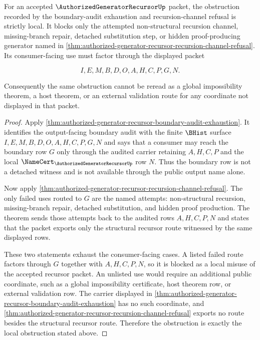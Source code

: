 \begin{corollary}
\label{cor:authorized-generator-recursor-boundary-audit-strict-obstruction}
For an accepted $\AuthorizedGeneratorRecursorUp$ packet, the obstruction recorded by the boundary-audit exhaustion and recursion-channel refusal is strictly local. It blocks only the attempted non-structural recursion channel, missing-branch repair, detached substitution step, or hidden proof-producing generator named in \autoref{thm:authorized-generator-recursor-recursion-channel-refusal}. Its consumer-facing use must factor through the displayed packet

$$
I,E,M,B,D,O,A,H,C,P,G,N.
$$

Consequently the same obstruction cannot be reread as a global impossibility theorem, a host theorem, or an external validation route for any coordinate not displayed in that packet.
\end{corollary}
\begin{proof}
Apply \autoref{thm:authorized-generator-recursor-boundary-audit-exhaustion}. It identifies the output-facing boundary audit with the finite $\BHist$ surface $I,E,M,B,D,O,A,H,C,P,G,N$ and says that a consumer may reach the boundary row $G$ only through the audited carrier retaining $A,H,C,P$ and the local $\NameCert_{\AuthorizedGeneratorRecursorUp}$ row $N$. Thus the boundary row is not a detached witness and is not available through the public output name alone.

Now apply \autoref{thm:authorized-generator-recursor-recursion-channel-refusal}. The only failed uses routed to $G$ are the named attempts: non-structural recursion, missing-branch repair, detached substitution, and hidden proof production. The theorem sends those attempts back to the audited rows $A,H,C,P,N$ and states that the packet exports only the structural recursor route witnessed by the same displayed rows.

These two statements exhaust the consumer-facing cases. A listed failed route factors through $G$ together with $A,H,C,P,N$, so it is blocked as a local misuse of the accepted recursor packet. An unlisted use would require an additional public coordinate, such as a global impossibility certificate, host theorem row, or external validation row. The carrier displayed in \autoref{thm:authorized-generator-recursor-boundary-audit-exhaustion} has no such coordinate, and \autoref{thm:authorized-generator-recursor-recursion-channel-refusal} exports no route besides the structural recursor route. Therefore the obstruction is exactly the local obstruction stated above.
\end{proof}
